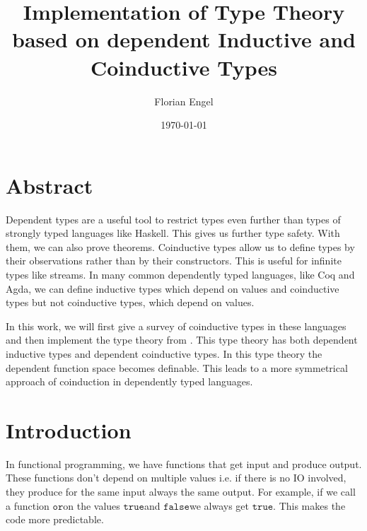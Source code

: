 \documentclass[a4paper,cleardoubleempty,BCOR1cm]{scrbook}
\author{Florian Engel}
\date{\today}
\title{Implementation of Type Theory based on dependent Inductive and Coinductive Types}
\begin{document}
\maketitle


\chapter*{Abstract}
  Dependent types are a useful tool to restrict types even further than types of
  strongly typed languages like Haskell. This gives us further type safety. With
  them, we can also prove theorems. Coinductive types allow us to define types by
  their observations rather than by their constructors. This is useful for
  infinite types like streams. In many common dependently typed languages, like
  Coq and Agda, we can define inductive types which depend on values and
  coinductive types but not coinductive types, which depend on values.

In this work, we will first give a survey of coinductive types in these
languages and then implement the type theory from \cite{basold2016type}. This
type theory has both dependent inductive types and dependent coinductive
types. In this type theory the dependent function space becomes definable.
This leads to a more symmetrical approach of coinduction in dependently typed
languages.

\setcounter{tocdepth}{2}
\tableofcontents

\chapter{Introduction}
\label{sec:orgdf5c36b}
In functional programming, we have functions that get input and produce
output. These functions don't depend on multiple values i.e. if there is no IO
involved, they produce for the same input always the same output. For example,
if we call a function $\mathtt{or}$\;on the values $\mathtt{true}$\;and $\mathtt{false}$\;we always get
$\mathtt{true}$. This makes the code more predictable.
\end{document}
